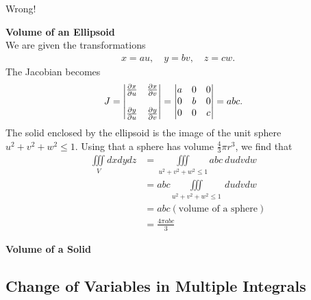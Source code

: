 \documentclass{article}
\begin{document}
Wrong!
\item %
\textbf{Volume of an Ellipsoid}\\
We are given the transformations
\begin{align*}
  x=au, \quad y=bv, \quad z=cw.
\end{align*}
The Jacobian becomes
\begin{align*}   J &=  
  \begin{vmatrix}
   \frac{\partial x}{\partial u} &  \frac{\partial x}{\partial v} \\ \\
   \frac{\partial y}{\partial u} & \frac{\partial y}{\partial v} \\
  \end{vmatrix}
  =     \begin{vmatrix}
 a&0&0\\
 0&b&0\\
 0&0&c\\
  \end{vmatrix}
  = abc.
 \end{align*}
 The solid enclosed by the ellipsoid is the image of the unit sphere $u^2 + v^2 + w^2 \le 1$. Using that a sphere has volume $\frac{4}{3} \pi r^3$, we find that 
\begin{align*}
  \iiint\limits_{V} dxdydz
  &=  \iiint\limits_{u^2+v^2+w^2 \le 1} abc \ dudvdw \\
  &=  abc \iiint\limits_{u^2+v^2+w^2 \le 1} \ dudvdw \\
  &=  abc (\text{volume of a sphere}) \\
  &=   \frac{4\pi abc}{3} 
\end{align*}

\item %
\textbf{Volume of a Solid}\\

\EEN

\subsection{Change of Variables in Multiple Integrals}
\end{document}
